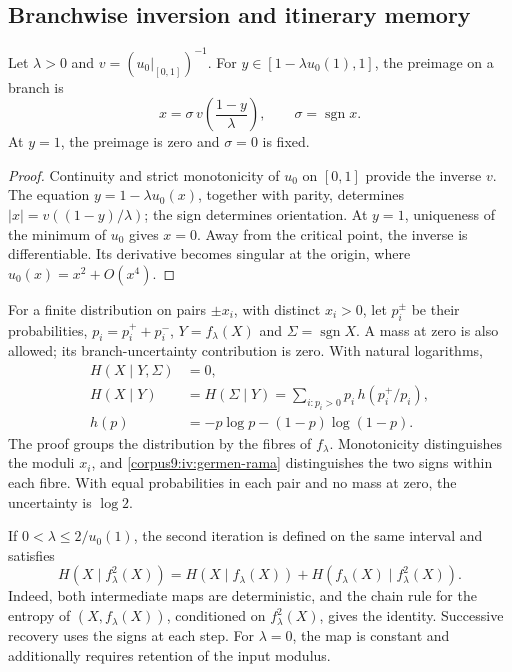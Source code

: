 \subsection{Branchwise inversion and itinerary memory}
\begin{proposition}
\label{corpus9:iv:germen-inversa}
Let \(\lambda>0\) and
\(v=(u_0|_{[0,1]})^{-1}\). For
\(y\in[1-\lambda u_0(1),1]\), the preimage on a branch is
\begin{equation}
 x=\sigma\,v\!\left(\frac{1-y}{\lambda}\right),
 \qquad \sigma=\operatorname{sgn}x.
 \label{corpus9:iv:germen-rama}
\end{equation}
At \(y=1\), the preimage is zero and \(\sigma=0\) is fixed.
\end{proposition}
\begin{proof}
Continuity and strict monotonicity of \(u_0\) on
\([0,1]\) provide the inverse \(v\).
The equation \(y=1-\lambda u_0(x)\), together with parity,
determines \(|x|=v((1-y)/\lambda)\); the sign determines
orientation. At \(y=1\), uniqueness of the minimum of \(u_0\)
gives \(x=0\). Away from the critical point, the inverse is
differentiable. Its derivative becomes singular at the
origin, where \(u_0(x)=x^2+O(x^4)\).
\end{proof}

For a finite distribution on pairs \(\pm x_i\), with distinct
\(x_i>0\), let \(p_i^\pm\) be their probabilities,
\(p_i=p_i^++p_i^-\), \(Y=f_\lambda(X)\) and
\(\Sigma=\operatorname{sgn}X\). A mass at zero is also
allowed; its branch-uncertainty contribution is zero. With
natural logarithms,
\begin{align}
 H(X\mid Y,\Sigma)&=0,\\
 H(X\mid Y)&=H(\Sigma\mid Y)
   =\sum_{i:p_i>0}p_i\,h(p_i^+/p_i),\\
 h(p)&=-p\log p-(1-p)\log(1-p).
 \label{corpus9:iv:germen-entropia}
\end{align}
The proof groups the distribution by the fibres of
\(f_\lambda\). Monotonicity distinguishes the moduli \(x_i\),
and \eqref{corpus9:iv:germen-rama} distinguishes the two signs
within each fibre. With equal probabilities in each pair
and no mass at zero, the uncertainty is \(\log2\).

If \(0<\lambda\leq2/u_0(1)\), the second iteration is
defined on the same interval and satisfies
\[
 H(X\mid f_\lambda^2(X))
 =H(X\mid f_\lambda(X))
  +H(f_\lambda(X)\mid f_\lambda^2(X)).
\]
Indeed, both intermediate maps are deterministic,
and the chain rule for the entropy of
\((X,f_\lambda(X))\), conditioned on \(f_\lambda^2(X)\),
gives the identity. Successive recovery uses the signs
at each step. For \(\lambda=0\), the map is constant
and additionally requires retention of the input modulus.

